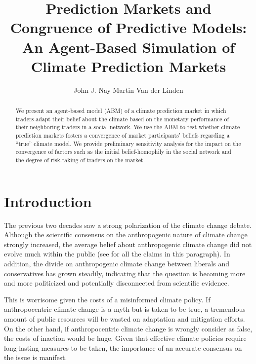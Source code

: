 \documentclass{sig-alternate}
\begin{document}
	
	\title{Prediction Markets and Congruence of Predictive Models:
  An Agent-Based Simulation of Climate Prediction Markets}
	
	\author{
    \alignauthor
		John J. Nay
		\alignauthor
		Martin Van der Linden
	}
		
	
	\maketitle
	\begin{abstract}
We present an agent-based model (ABM) of a climate prediction market in which traders adapt their belief about the climate based on the monetary performance of their neighboring traders in a social network. We use the ABM to test whether climate prediction markets fosters a convergence of market participants' beliefs regarding a ``true'' climate model. We provide preliminary sensitivity analysis for the impact on the convergence of factors such as the initial belief-homophily in the social network and the degree of risk-taking of traders on the market.
	\end{abstract}
	
	
	\section{Introduction}
	
	The previous two decades saw a strong polarization of the climate change debate. Although the scientific consensus on the anthropogenic nature of climate change strongly increased,  the average belief about anthropogenic climate change did not evolve much within the public (see \cite{Vandenbergh2013f} for all the claims in this paragraph). In addition, the divide on anthropogenic climate change between liberals and conservatives has grown steadily, indicating that the question is becoming more and more politicized and potentially disconnected from scientific evidence.
	
	This is worrisome given the costs of a misinformed climate policy. If anthropocentric climate change is a myth but is taken to be true, a tremendous amount of public resources will be wasted on adaptation and mitigation efforts. On the other hand, if anthropocentric climate change is wrongly consider as false, the costs of inaction would be huge. Given that effective climate policies require long-lasting measures to be taken, the importance of an accurate consensus on the issue is manifest. 
	
\end{document}

